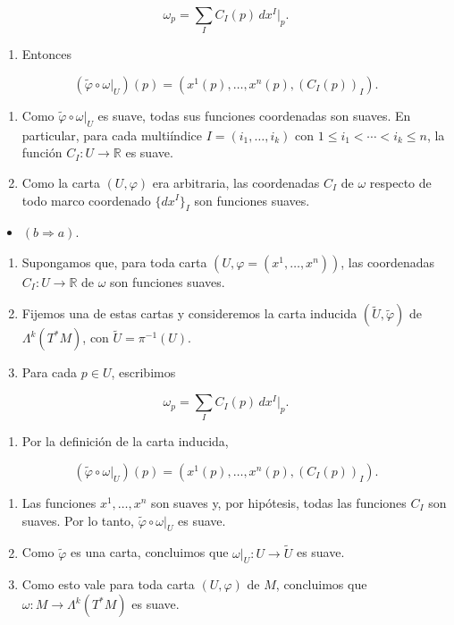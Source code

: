 \begin{bookproof}{}
\[
\omega_p=\sum_I C_I(p)\,dx^I|_p.
\]
\begin{enumerate}[start=6]
\item Entonces
\end{enumerate}
\[
(\widetilde\varphi\circ\omega|_U)(p)=\left(x^1(p),\ldots,x^n(p),(C_I(p))_I\right).
\]
\begin{enumerate}[start=7]
\item Como $\widetilde\varphi\circ\omega|_U$ es suave, todas sus funciones coordenadas son suaves. En particular, para cada multiíndice $I=(i_1,\ldots,i_k)$ con $1\le i_1<\cdots<i_k\le n$, la función $C_I:U\to\mathbb R$ es suave.
\item Como la carta $(U,\varphi)$ era arbitraria, las coordenadas $C_I$ de $\omega$ respecto de todo marco coordenado $\{dx^I\}_I$ son funciones suaves.
\end{enumerate}
\begin{itemize}
\item $(b\Rightarrow a)$.
\end{itemize}
\begin{enumerate}
\item Supongamos que, para toda carta $(U,\varphi=(x^1,\ldots,x^n))$, las coordenadas $C_I:U\to\mathbb R$ de $\omega$ son funciones suaves.
\item Fijemos una de estas cartas y consideremos la carta inducida $(\widetilde U,\widetilde\varphi)$ de $\Lambda^k(T^*M)$, con $\widetilde U=\pi^{-1}(U)$.
\item Para cada $p\in U$, escribimos
\end{enumerate}
\[
\omega_p=\sum_I C_I(p)\,dx^I|_p.
\]
\begin{enumerate}[start=4]
\item Por la definición de la carta inducida,
\end{enumerate}
\[
(\widetilde\varphi\circ\omega|_U)(p)=\left(x^1(p),\ldots,x^n(p),(C_I(p))_I\right).
\]
\begin{enumerate}[start=5]
\item Las funciones $x^1,\ldots,x^n$ son suaves y, por hipótesis, todas las funciones $C_I$ son suaves. Por lo tanto, $\widetilde\varphi\circ\omega|_U$ es suave.
\item Como $\widetilde\varphi$ es una carta, concluimos que $\omega|_U:U\to\widetilde U$ es suave.
\item Como esto vale para toda carta $(U,\varphi)$ de $M$, concluimos que $\omega:M\to\Lambda^k(T^*M)$ es suave.
\end{enumerate}
\begin{itemize}

\end{itemize}
\end{bookproof}

